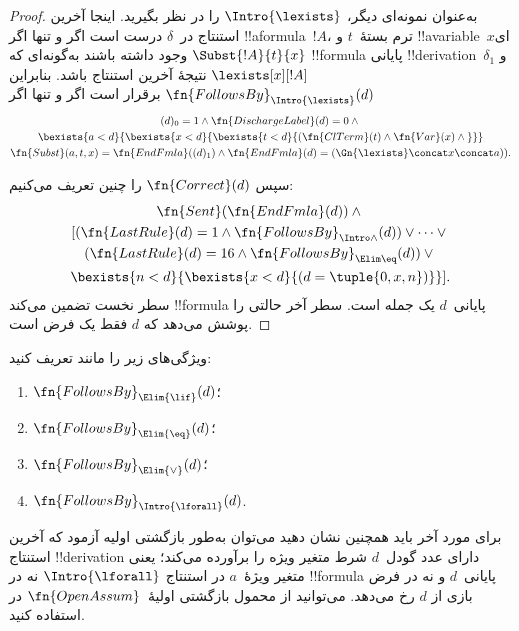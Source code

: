 \documentclass[../../../include/open-logic-section]{subfiles}
\begin{document}
\begin{proof}
  به‌عنوان نمونه‌ای دیگر، $\Intro{\lexists}$ را در نظر بگیرید. اینجا
  آخرین استنتاج در~$\delta$ درست است اگر و تنها اگر !!a{formula}~$!A$،
  ترم بستهٔ~$t$ و !!a{variable}~$x$ای وجود داشته باشند به‌گونه‌ای که
  $\Subst{!A}{t}{x}$ !!{formula} پایانی !!{derivation}~$\delta_1$ و
  $\lexists[x][!A]$ نتیجهٔ آخرین استنتاج باشد. بنابراین
  $\fn{FollowsBy}_{\Intro{\lexists}}(d)$ برقرار است اگر و تنها اگر
  \begin{multline*}
    (d)_0 = 1 \land \fn{DischargeLabel}(d) = 0 \land {} \\
    \bexists{a < d}{\bexists{x<d}{\bexists{t<d}{
          (\fn{ClTerm}(t) \land \fn{Var}(x)  \land {}}}}\\
    \fn{Subst}(a,t,x) = \fn{EndFmla}((d)_1) \land
    \fn{EndFmla}(d) = (\Gn{\lexists} \concat x \concat a)).
  \end{multline*}

  سپس $\fn{Correct}(d)$ را چنین تعریف می‌کنیم:
  \begin{multline*}
    \fn{Sent}(\fn{EndFmla}(d)) \land {}\\
    [ (\fn{LastRule}(d) = 1 \land
    \fn{FollowsBy}_{\Intro\land}(d)) \lor \dots \lor {}\\
    (\fn{LastRule}(d) = 16 \land \fn{FollowsBy}_{\Elim\eq}(d)) \lor {}\\
    \bexists{n<d}{\bexists{x<d}{(d = \tuple{0, x, n})}} ].
  \end{multline*}
  سطر نخست تضمین می‌کند !!{formula} پایانی~$d$ یک جمله است. سطر آخر
  حالتی را پوشش می‌دهد که $d$ فقط یک فرض است.
\end{proof}

\begin{prob}
  ویژگی‌های زیر را مانند  تعریف
  کنید:
  \begin{enumerate}
  \item $\fn{FollowsBy}_{\Elim{\lif}}(d)$؛
  \item $\fn{FollowsBy}_{\Elim{\eq}}(d)$؛
  \item $\fn{FollowsBy}_{\Elim{\lor}}(d)$؛
  \item $\fn{FollowsBy}_{\Intro{\lforall}}(d)$.
  \end{enumerate}
  برای مورد آخر باید همچنین نشان دهید می‌توان به‌طور بازگشتی اولیه
  آزمود که آخرین استنتاج !!{derivation} دارای عدد گودل~$d$ شرط متغیر ویژه
  را برآورده می‌کند؛ یعنی متغیر ویژهٔ~$a$ در استنتاج
  $\Intro{\lforall}$ نه در !!{formula} پایانی~$d$ و نه در فرض بازی از
  $d$ رخ می‌دهد. می‌توانید از محمول بازگشتی اولیهٔ~$\fn{OpenAssum}$
  در  استفاده کنید.
\end{prob}
\end{document}
